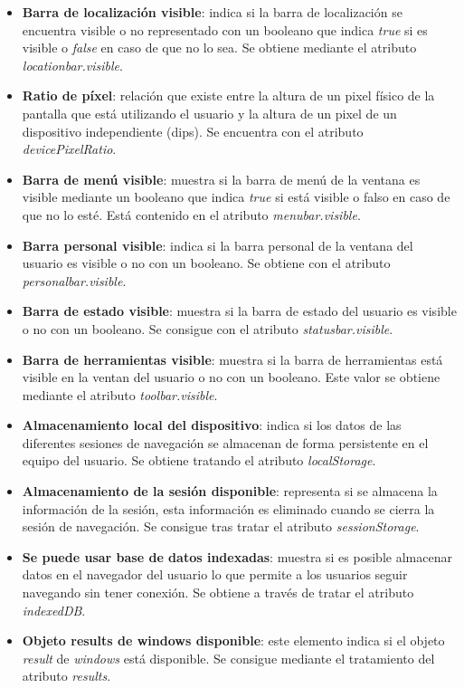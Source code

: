 \begin{itemize} 
    \item \textbf{Barra de localización visible}: indica si la barra de localización se encuentra visible o no representado con un booleano que indica \textit{true} si es visible o \textit{false} en caso de que no lo sea. Se obtiene mediante el atributo \textit{locationbar.visible}.
    \item \textbf{Ratio de píxel}: relación que existe entre la altura de un pixel físico de la pantalla que está utilizando el usuario y la altura de un pixel de un dispositivo independiente (dips). Se encuentra con el atributo \textit{devicePixelRatio}.
    \item \textbf{Barra de menú visible}: muestra si la barra de menú de la ventana es visible mediante un booleano que indica \textit{true} si está visible o falso en caso de que no lo esté. Está contenido en el atributo \textit{menubar.visible}.
    \item \textbf{Barra personal visible}: indica si la barra personal de la ventana del usuario es visible o no con un booleano. Se obtiene con el atributo \textit{personalbar.visible}.
    \item \textbf{Barra de estado visible}: muestra si la barra de estado del usuario es visible o no con un booleano. Se consigue con el atributo \textit{statusbar.visible}.
    \item \textbf{Barra de herramientas visible}: muestra si la barra de herramientas está visible en la ventan del usuario o no con un booleano. Este valor se obtiene mediante el atributo \textit{toolbar.visible}.
    \item \textbf{Almacenamiento local del dispositivo}: indica si los datos de las diferentes sesiones de navegación se almacenan de forma persistente en el equipo del usuario. Se obtiene tratando el atributo \textit{localStorage}.
    \item \textbf{Almacenamiento de la sesión disponible}: representa si se almacena la información de la sesión, esta información es eliminado cuando se cierra la sesión de navegación. Se consigue tras tratar el atributo \textit{sessionStorage}.
    \item \textbf{Se puede usar base de datos indexadas}: muestra si es posible almacenar datos en el navegador del usuario lo que permite a los usuarios seguir navegando sin tener conexión. Se obtiene a través de tratar el atributo \textit{indexedDB}.
    \item \textbf{Objeto results de windows disponible}: este elemento indica si el objeto \textit{result} de \textit{windows} está disponible. Se consigue mediante el tratamiento del atributo \textit{results}.
\end{itemize}
